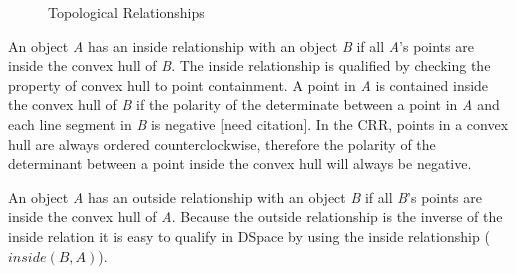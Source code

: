 \documentclass[12pt]{ucthesis}
\begin{document}
\begin{figure}[b]
 \centering
 \hspace{4 mm}
  \hspace{4 mm}
 \hspace{2 mm}
 \caption{Topological Relationships}
\label{topoloy}
\end{figure}

An object \emph{A} has an inside relationship with an object \emph{B} if all \emph{A}'s points are inside the convex hull of \emph{B}. The inside relationship is qualified by checking the property of convex hull to point containment. A point in \emph{A} is contained inside the convex hull of \emph{B} if the polarity of the determinate between a point in \emph{A} and each line segment in \emph{B} is negative [need citation]. In the CRR, points in a convex hull are always ordered counterclockwise, therefore the polarity of the determinant between a point inside the convex hull will always be negative. 

An object \emph{A} has an outside relationship with an object \emph{B} if all \emph{B}'s points are inside the convex hull of \emph{A}. Because the outside relationship is the inverse of the inside relation it is easy to qualify in DSpace by using the inside relationship ($inside(B,A)$). 
\end{document}

